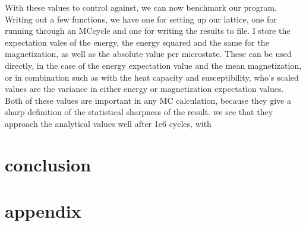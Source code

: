 \documentclass[10pt, twocolumn]{revtex4-1}
\begin{document}
With these values to control against, we can now benchmark our program. Writing out a few functions, we have one for setting up our lattice, one for running
through an MCcycle and one for writing the results to file. I store the expectation vales of the energy, the energy squared and the same for the magnetization,
as well as the absolute value per microstate. These can be used directly, in the case of the energy expectation value and the mean magnetization, or in
combination such as with the heat capacity and susceptibility, who's scaled values are the variance in either energy or magnetization expectation values. Both
of these values are important in any MC calculation, because they give a sharp definition of the statistical sharpness of the result.
we see that they approach the analytical values well after 1e6 cycles, with %

\section{conclusion}

\section{appendix}



\end{document}
